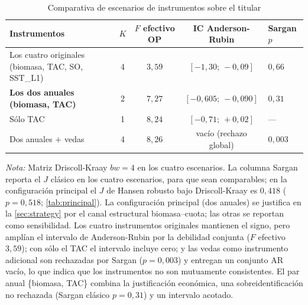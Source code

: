 \documentclass[11pt]{article}
\newcommand{\note}[2]{%
  \par\vspace{0.5ex}
  \begin{minipage}{#1}\footnotesize\textit{Nota:} #2\end{minipage}%
}
\begin{document}
\begin{table}[htbp]
  \caption{Comparativa de escenarios de instrumentos sobre el titular}\label{tab:escenarios_instrumentos}
  \centering
  \begin{tabular}{@{} lcccl @{}}
    \toprule
    Instrumentos & $K$ & $F$ efectivo OP & IC Anderson-Rubin & Sargan $p$ \\
    \midrule
    Los cuatro originales (biomasa, TAC, SO, SST\_L1) & 4 & $3{,}59$ & $[-1{,}30;\ -0{,}09]$ & $0{,}66$ \\
    \textbf{Los dos anuales (biomasa, TAC)}           & 2 & $7{,}27$ & $[-0{,}605;\ -0{,}090]$ & $0{,}31$ \\
    Sólo TAC                                           & 1 & $8{,}24$ & $[-0{,}71;\ +0{,}02]$   & ---      \\
    Dos anuales $+$ vedas                              & 4 & $8{,}26$ & vacío (rechazo global)   & $0{,}003$ \\
    \bottomrule
  \end{tabular}
  \note{0.9\textwidth}{Matriz Driscoll-Kraay $bw=4$ en los cuatro escenarios. La columna Sargan reporta el $J$ clásico en los cuatro escenarios, para que sean comparables; en la configuración principal el $J$ de Hansen robusto bajo Driscoll-Kraay es $0{,}418$ ($p=0{,}518$; \autoref{tab:principal}). La configuración principal (dos anuales) se justifica en la \autoref{sec:strategy} por el canal estructural biomasa--cuota; las otras se reportan como sensibilidad. Los cuatro instrumentos originales mantienen el signo, pero amplían el intervalo de Anderson-Rubin por la debilidad conjunta ($F$ efectivo $3{,}59$); con sólo el TAC el intervalo incluye cero; y las vedas como instrumento adicional son rechazadas por Sargan ($p=0{,}003$) y entregan un conjunto AR vacío, lo que indica que los instrumentos no son mutuamente consistentes. El par anual \{biomasa, TAC\} combina la justificación económica, una sobreidentificación no rechazada (Sargan clásico $p=0{,}31$) y un intervalo acotado.}
\end{table}
\end{document}
